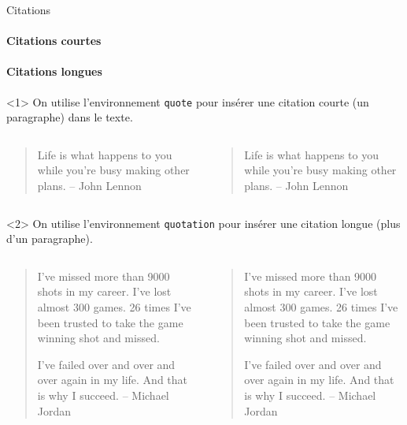 \begin{frame}[fragile,c]{Citations}
\framesubtitle<1>{Citations courtes}
\framesubtitle<2>{Citations longues}
\begin{onlyenv}<1>
	On utilise l'environnement \texttt{quote} pour insérer une citation courte (un paragraphe)
	dans le texte.
	
	\begin{columns}
		\begin{column}{.49\textwidth}
			\vspace{-17mm}
\begin{codesource}
	\begin{quote}
		Life is what happens to you while 
		you're busy making other plans. 
		-- John Lennon
	\end{quote}
\end{codesource}
		\end{column}
		
		\begin{column}{.49\textwidth}
			\begin{quote}
				Life is what happens to you while you're busy making other plans. -- John Lennon
			\end{quote}
		\end{column}
	\end{columns}
\end{onlyenv}

\begin{onlyenv}<2>
	On utilise l'environnement \texttt{quotation} pour insérer une citation longue (plus
	d'un paragraphe).
	
	\begin{columns}
		\begin{column}{.49\textwidth}
			\vspace{-38mm}
\begin{codesource}
	\begin{quotation}
		I've missed more than 9000 shots in my 
		career. I've lost almost 300 games. 26 
		times I've been trusted to take the game 
		winning shot and missed.
		
		I've failed over and over and over again 
		in my life. And that is why I succeed. 
		-- Michael Jordan
	\end{quotation}
\end{codesource}	
		\end{column}
		
		\begin{column}{.49\textwidth}
			\begin{quotation}
				I've missed more than 9000 shots in my career. 
				I've lost almost 300 games. 26 times I've been 
				trusted to take the game winning shot and missed.
				
				I've failed over and over and over again in my life. 
				And that is why I succeed. -- Michael Jordan
			\end{quotation}
		\end{column}
	\end{columns}
\end{onlyenv}
\end{frame}

